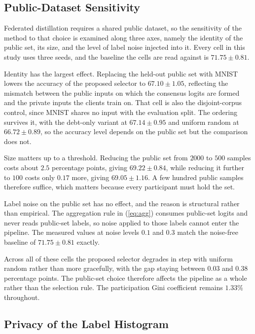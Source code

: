 \documentclass[journal]{IEEEtran}
\newcommand{\rev}[1]{#1}
\begin{document}
\subsection{Public-Dataset Sensitivity}
\label{ssec:exp-publicset}

\rev{Federated distillation requires a shared public dataset, so the sensitivity of the method to that choice is examined along three axes, namely the identity of the public set, its size, and the level of label noise injected into it. Every cell in this study uses three seeds, and the baseline the cells are read against is $71.75 \pm 0.81$.}

\rev{Identity has the largest effect. Replacing the held-out public set with MNIST lowers the accuracy of the proposed selector to $67.10 \pm 1.05$, reflecting the mismatch between the public inputs on which the consensus logits are formed and the private inputs the clients train on. That cell is also the disjoint-corpus control, since MNIST shares no input with the evaluation split. The ordering survives it, with the debt-only variant at $67.14 \pm 0.95$ and uniform random at $66.72 \pm 0.89$, so the accuracy level depends on the public set but the comparison does not.}

\rev{Size matters up to a threshold. Reducing the public set from $2000$ to $500$ samples costs about $2.5$ percentage points, giving $69.22 \pm 0.84$, while reducing it further to $100$ costs only $0.17$ more, giving $69.05 \pm 1.16$. A few hundred public samples therefore suffice, which matters because every participant must hold the set.}

\rev{Label noise on the public set has no effect, and the reason is structural rather than empirical. The aggregation rule in (\ref{eq:agg}) consumes public-set logits and never reads public-set labels, so noise applied to those labels cannot enter the pipeline. The measured values at noise levels $0.1$ and $0.3$ match the noise-free baseline of $71.75 \pm 0.81$ exactly.}

\rev{Across all of these cells the proposed selector degrades in step with uniform random rather than more gracefully, with the gap staying between $0.03$ and $0.38$ percentage points. The public-set choice therefore affects the pipeline as a whole rather than the selection rule. The participation Gini coefficient remains $1.33\%$ throughout.}

\subsection{Privacy of the Label Histogram}
\label{ssec:exp-privacy}
\end{document}
